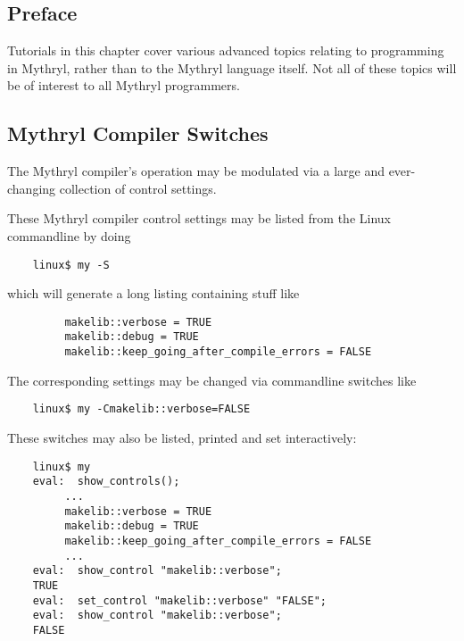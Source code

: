 
\subsection{Preface}
\label{section:tut:topic:preface}

Tutorials in this chapter cover various advanced topics relating to programming 
in Mythryl, rather than to the Mythryl language itself.  Not all of these topics 
will be of interest to all Mythryl programmers.

\cutend*

\subsection{Mythryl Compiler Switches}
\label{section:tut:topic:compiler-switches}

The Mythryl compiler's operation may be modulated via a large and 
ever-changing collection of control settings.

These Mythryl compiler control settings may be listed 
from the Linux commandline by doing

\begin{verbatim}
    linux$ my -S
\end{verbatim}

which will generate a long listing containing stuff like

\begin{verbatim}
         makelib::verbose = TRUE
         makelib::debug = TRUE
         makelib::keep_going_after_compile_errors = FALSE
\end{verbatim}

The corresponding settings may be changed via commandline switches like

\begin{verbatim}
    linux$ my -Cmakelib::verbose=FALSE
\end{verbatim}

These switches may also be listed, printed and set interactively:

\begin{verbatim}
    linux$ my
    eval:  show_controls();
         ...
         makelib::verbose = TRUE
         makelib::debug = TRUE
         makelib::keep_going_after_compile_errors = FALSE
         ...
    eval:  show_control "makelib::verbose";
    TRUE
    eval:  set_control "makelib::verbose" "FALSE";
    eval:  show_control "makelib::verbose";
    FALSE
\end{verbatim}

